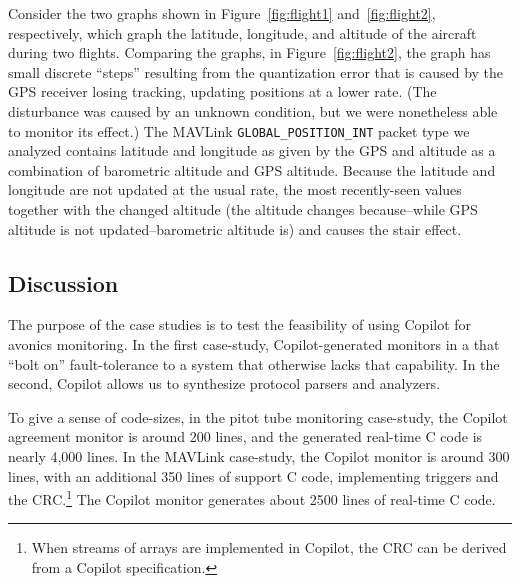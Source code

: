 \noindent
Consider the two graphs shown in Figure~\ref{fig:flight1}
and~\ref{fig:flight2}, respectively, which graph the latitude, longitude, and
altitude of the aircraft during two flights.  Comparing the graphs, in
Figure~\ref{fig:flight2}, the graph has small discrete ``steps'' resulting from
the quantization error that is caused by the GPS receiver losing tracking,
updating positions at a lower rate.  (The disturbance was caused by an unknown
condition, but we were nonetheless able to monitor its effect.)  The MAVLink
{\small \tt GLOBAL\_POSITION\_INT} packet type we analyzed contains latitude and
longitude as given by the GPS and altitude as a combination of barometric
altitude and GPS altitude.  Because the latitude and longitude are not updated
at the usual rate, the most recently-seen values together with the changed
altitude (the altitude changes because--while GPS altitude is not
updated--barometric altitude is) and causes the stair effect.


\subsection{Discussion}
The purpose of the case studies is to test the feasibility of using Copilot for
avonics monitoring.  In the first case-study, Copilot-generated monitors in a
that ``bolt on'' fault-tolerance to a system that otherwise lacks that
capability.  In the second, Copilot allows us to synthesize protocol parsers and
analyzers.

To give a sense of code-sizes, in the pitot tube monitoring case-study, the
Copilot agreement monitor is around 200 lines, and the generated real-time C
code is nearly 4,000 lines.  In the MAVLink case-study, the Copilot monitor is
around 300 lines, with an additional 350 lines of support C code, implementing
triggers and the CRC.\footnote{When streams of arrays are implemented in
  Copilot, the CRC can be derived from a Copilot specification.}  The Copilot
monitor generates about 2500 lines of real-time C code.





